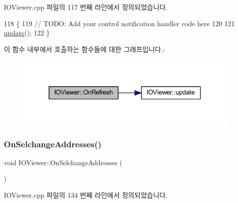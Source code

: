 I\+O\+Viewer.\+cpp 파일의 117 번째 라인에서 정의되었습니다.


\begin{DoxyCode}
118 \{
119   \textcolor{comment}{// TODO: Add your control notification handler code here}
120 
121   \mbox{\hyperlink{class_i_o_viewer_a500c8fc593280ff95977fb59293b6ab6}{update}}();  
122 \}
\end{DoxyCode}
이 함수 내부에서 호출하는 함수들에 대한 그래프입니다.\+:
\nopagebreak
\begin{figure}[H]
\begin{center}
\leavevmode
\includegraphics[width=314pt]{class_i_o_viewer_a1a50f763e39ff7672a2665ab23e44ee7_cgraph}
\end{center}
\end{figure}
\mbox{\label{class_i_o_viewer_a406130e0b8572721cf8ede30d2005fa2}} 
\subsubsection{\texorpdfstring{On\+Selchange\+Addresses()}{OnSelchangeAddresses()}}
{\footnotesize\ttfamily void I\+O\+Viewer\+::\+On\+Selchange\+Addresses (\begin{DoxyParamCaption}{ }\end{DoxyParamCaption})\hspace{0.3cm}{\ttfamily [protected]}}



I\+O\+Viewer.\+cpp 파일의 134 번째 라인에서 정의되었습니다.


